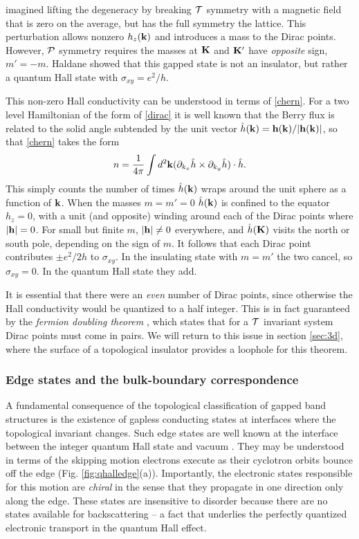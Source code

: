 \documentclass[twocolumn,floatfix,showpacs,rmp,aps]{revtex4}
\begin{document}
\textcite{haldane88} imagined lifting the degeneracy by breaking ${\cal T}$
symmetry with a magnetic field that is zero
on the average, but has the full symmetry the lattice.  This
perturbation allows nonzero $h_z({\bf k})$ and introduces a mass to
the Dirac points.  However, $\cal P$ symmetry requires the masses at ${\bf
K}$ and ${\bf K}'$
have {\it opposite} sign, $m' = - m$. Haldane showed that this gapped
state is not an insulator, but rather a quantum Hall state with
$\sigma_{xy} = e^2/h$.

This non-zero Hall conductivity can be understood in terms of
\eqref{chern}.  For a two level Hamiltonian of the form of \eqref{dirac} it
is well known that the Berry flux\cite{berry84} is related to
the solid angle subtended by the unit vector $\hat h({\bf k}) =
{\bf h}({\bf k})/|{\bf h}({\bf k})|$, so that \eqref{chern} takes the form
\begin{equation}
n = \frac{1}{4\pi}\int d^2{\bf k}
(\partial_{k_x} \hat h \times \partial_{k_y} \hat h)\cdot \hat h .
\end{equation}
This simply counts the number of times $\hat h({\bf k})$ wraps around
the unit sphere as a function of ${\bf k}$.  When the masses $m=m'=0$
$\hat h({\bf k})$ is confined to the equator $h_z=0$, with a unit
(and opposite)
winding around each of the Dirac points where $|{\bf h}|=0$.
For small but finite $m$, $|{\bf h}|\ne 0$ everywhere, and $\hat h({\bf K})$
visits the north or south pole, depending on the sign of $m$.
It follows that each Dirac point contributes $\pm e^2/2h$ to $\sigma_{xy}$.  In
the insulating state with $m=m'$ the two cancel, so
$\sigma_{xy}=0$. In the quantum Hall state they add.

It is essential that there were an {\it even} number of Dirac points, since
otherwise the Hall conductivity would be quantized to a half integer.  This is
in fact guaranteed by the {\it fermion doubling theorem} \cite{nielssen83}, which states that for
a ${\cal T}$ invariant system Dirac points must come in pairs.  We will
return to this issue in section \ref{sec:3d}, where the surface of a topological
insulator provides a loophole for this theorem.


\subsubsection{Edge states and the bulk-boundary correspondence}
\label{sec:edge}

A fundamental consequence of the topological classification of gapped
band structures is the existence of gapless conducting states at
interfaces where the topological invariant changes.  Such edge states
are well known at the interface between the integer quantum Hall
state and vacuum \cite{halperin82}.  They may be understood in terms of the
skipping motion electrons execute as their
cyclotron orbits bounce off the edge (Fig. \ref{fig:qhalledge}(a)).
Importantly, the electronic
states responsible for this motion are {\it chiral} in the sense that
they propagate in one direction only along the edge.  These states
are insensitive to disorder because there are no states available for
backscattering -- a fact that underlies the perfectly
quantized electronic transport in the quantum Hall effect.
\end{document}
